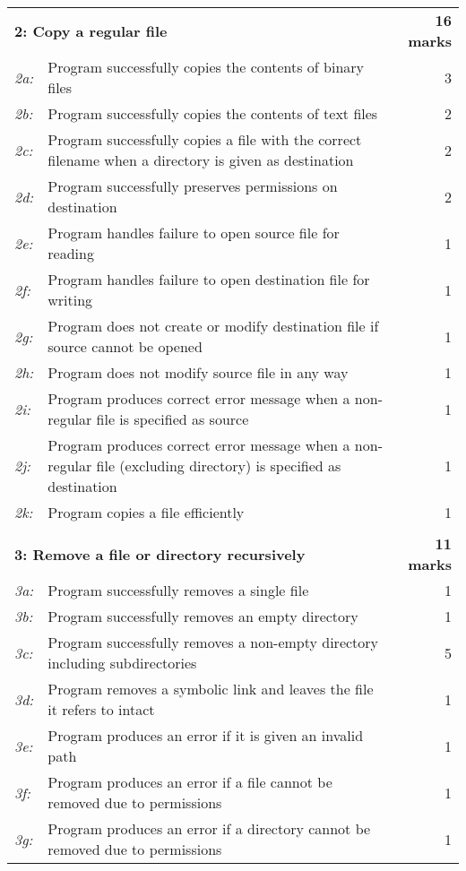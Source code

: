 \documentclass[12pt,a4paper]{article}
\begin{document}
\begin{longtable}{l p{12cm} r}
    & & \\ \midrule \multicolumn{2}{l}{\textbf{2: Copy a regular file}} &
    \textbf{16 marks} \\
    \textit{2a:} & Program successfully copies the contents of binary files & 3
    \\
    \textit{2b:} & Program successfully copies the contents of text files & 2 \\
    \textit{2c:} & Program successfully copies a file with the correct filename when a directory is given as destination & 2 \\
    \textit{2d:} & Program successfully preserves permissions on destination & 2 \\
    \textit{2e:} & Program handles failure to open source file for reading & 1 \\
    \textit{2f:} & Program handles failure to open destination file for writing & 1 \\
    \textit{2g:} & Program does not create or modify destination file if source cannot be opened & 1 \\ 
    \textit{2h:} & Program does not modify source file in any way & 1 \\
    \textit{2i:} & Program produces correct error message when a non-regular file is specified as source & 1 \\
    \textit{2j:} & Program produces correct error message when a non-regular file (excluding directory) is specified as destination & 1 \\
    \textit{2k:} & Program copies a file efficiently & 1 \\

    & & \\ \midrule \multicolumn{2}{l}{\textbf{3: Remove a file or directory  recursively}} & \textbf{11 marks} \\
    \textit{3a:} & Program successfully removes a single file & 1 \\
    \textit{3b:} & Program successfully removes an empty directory & 1 \\
    \textit{3c:} & Program successfully removes a non-empty directory including subdirectories & 5 \\
    \textit{3d:} & Program removes a symbolic link and leaves the file it refers to intact & 1 \\
    \textit{3e:} & Program produces an error if it is given an invalid path & 1 \\
    \textit{3f:} & Program produces an error if a file cannot be removed due to permissions & 1 \\
    \textit{3g:} & Program produces an error if a directory cannot be removed due to permissions & 1 \\


\end{longtable}
\end{document}
